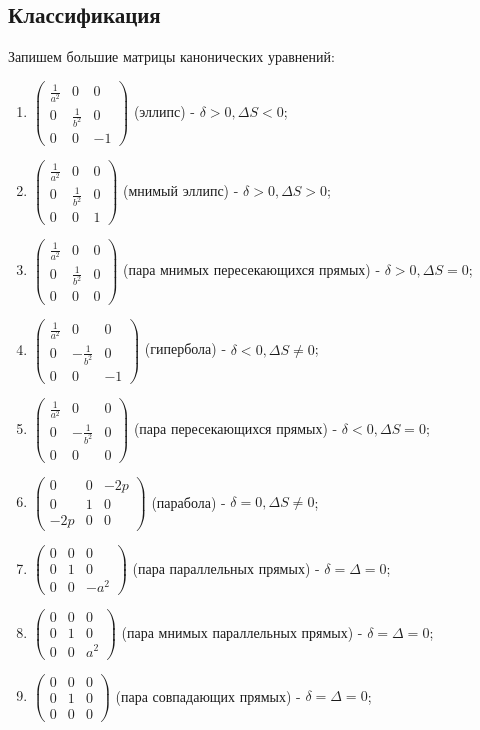\documentclass[a4paper, 12pt]{article}
\theoremstyle{definition}
\begin{document}
	\subsection{Классификация}
	Запишем большие матрицы канонических уравнений:
	\begin{enumerate}
		\item $\begin{pmatrix} \frac{1}{a^2}&0&0 \\ 0&\frac{1}{b^2}&0 \\ 0&0&-1 \end{pmatrix}$ (эллипс) - $\delta > 0, \Delta S < 0$;
		\item $\begin{pmatrix} \frac{1}{a^2}&0&0 \\ 0&\frac{1}{b^2}&0 \\ 0&0&1 \end{pmatrix}$ (мнимый эллипс) - $\delta > 0, \Delta S > 0$;
		\item $\begin{pmatrix} \frac{1}{a^2}&0&0 \\ 0&\frac{1}{b^2}&0 \\ 0&0&0 \end{pmatrix}$ (пара мнимых пересекающихся прямых) - $\delta > 0, \Delta S = 0$;
		\item $\begin{pmatrix} \frac{1}{a^2}&0&0 \\ 0&-\frac{1}{b^2}&0 \\ 0&0&-1 \end{pmatrix}$ (гипербола) - $\delta < 0, \Delta S \neq 0$;
		\item $\begin{pmatrix} \frac{1}{a^2}&0&0 \\ 0&-\frac{1}{b^2}&0 \\ 0&0&0 \end{pmatrix}$ (пара пересекающихся прямых) - $\delta < 0, \Delta S = 0$;
		\item $\begin{pmatrix} 0&0&-2p \\ 0&1&0 \\ -2p&0&0 \end{pmatrix}$ (парабола) - $\delta = 0, \Delta S \neq 0$;
		\item $\begin{pmatrix} 0&0&0 \\ 0&1&0 \\ 0&0&-a^2 \end{pmatrix}$ (пара параллельных прямых) - $\delta = \Delta = 0$;
		\item $\begin{pmatrix} 0&0&0 \\ 0&1&0 \\ 0&0&a^2 \end{pmatrix}$ (пара мнимых параллельных прямых) - $\delta = \Delta = 0$;
		\item $\begin{pmatrix} 0&0&0 \\ 0&1&0 \\ 0&0&0 \end{pmatrix}$ (пара совпадающих прямых) - $\delta = \Delta = 0$;
	\end{enumerate}
	
\end{document}
